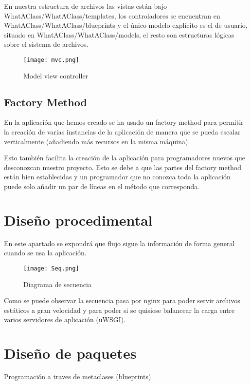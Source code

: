 En nuestra estructura de archivos las vistas están bajo WhatAClass/WhatAClass/templates, los controladores se encuentran en WhatAClass/WhatAClass/blueprints y el único modelo explícito es el de usuario, situado en WhatAClass/WhatAClass/models, el resto son estructuras lógicas sobre el sistema de archivos.


\begin{figure}
	\centering
	\texttt{[image: mvc.png]}
	\caption{Model view controller}\label{fig:mvc.png}
\end{figure}



\subsection{Factory Method}

En la aplicación que hemos creado se ha usado un factory method para permitir la creación de varias instancias de la aplicación de manera que se pueda escalar verticalmente (añadiendo más recursos en la misma máquina).

Esto también facilita la creación de la aplicación para programadores nuevos que desconozcan nuestro proyecto. Esto se debe a que las partes del factory method están bien establecidas y un programador que no conozca toda la aplicación puede solo añadir un par de líneas en el método que corresponda.


\section{Diseño procedimental}
En este apartado se expondrá que flujo sigue la información de forma general cuando se usa la aplicación.


\begin{figure}
	\centering
	\texttt{[image: Seq.png]}
	\caption{Diagrama de secuencia}\label{fig:Seq.png}
\end{figure}

Como se puede observar la secuencia pasa por nginx para poder servir archivos estáticos a gran velocidad y para poder si se quisiese balancear la carga entre varios servidores de aplicación (uWSGI).


\section{Diseño de paquetes}


Programación a traves de metaclases (blueprints)


